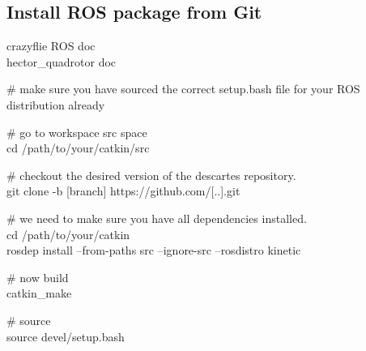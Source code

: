 \documentclass[a4paper, 12pt]{report}
\begin{document}
\subsection{Install ROS package from Git}
\label{app:rosGit}
crazyflie ROS doc \cite{Hoenig2015}\\
hector\_quadrotor doc \cite{Meyer2012}


\# make sure you have sourced the correct setup.bash file for your ROS distribution already

\# go to workspace src space\\
cd /path/to/your/catkin/src

\# checkout the desired version of the descartes repository.\\
git clone -b [branch] https://github.com/[..].git

\# we need to make sure you have all dependencies installed.\\
cd /path/to/your/catkin\\
rosdep install --from-paths src --ignore-src --rosdistro kinetic

\# now build\\
catkin\_make

\# source\\
source devel/setup.bash
\end{document}
